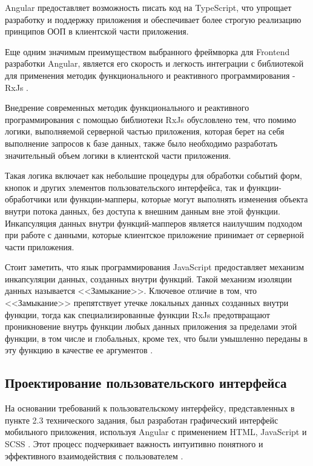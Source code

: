 Angular предоставляет возможность писать код на TypeScript, что упрощает разработку и поддержку приложения и обеспечивает более строгую реализацию принципов ООП в клиентской части приложения.

Еще одним значимым преимуществом выбранного фреймворка для Frontend разработки Angular, является его скорость и легкость интеграции с библиотекой для применения методик функционального и реактивного программирования -\- RxJs \cite{rxjs}.

Внедрение современных методик функционального и реактивного программирования с помощью библиотеки RxJs обусловлено тем, что помимо логики, выполняемой серверной частью приложения, которая берет на себя выполнение запросов к базе данных, также было необходимо разработать значительный объем логики в клиентской части приложения.

Такая логика включает как небольшие процедуры для обработки событий форм, кнопок и других элементов пользовательского интерфейса, так и функции-обработчики или функции-мапперы, которые могут выполнять изменения объекта внутри потока данных, без доступа к внешним данным вне этой функции. Инкапсуляция данных внутри функций-мапперов является наилучшим подходом при работе с данными, которые клиентское приложение принимает от серверной части приложения.

Стоит заметить, что язык программирования JavaScript предоставляет механизм инкапсуляции данных, созданных внутри функций. Такой механизм изоляции данных называется <<Замыкание>>. Ключевое отличие в том, что <<Замыкание>> препятствует утечке локальных данных созданных внутри функции, тогда как специализированные функции RxJs предотвращают проникновение внутрь функции любых данных приложения за пределами этой функции, в том числе и глобальных, кроме тех, что были умышленно переданы в эту функцию в качестве ее аргументов \cite{rxjs}.

\subsection{Проектирование пользовательского интерфейса}

На основании требований к пользовательскому интерфейсу, представленных в пункте 2.3 технического задания, был разработан графический интерфейс мобильного приложения, используя Angular с применением HTML, JavaScript и SCSS \cite{cssspecs}. Этот процесс подчеркивает важность интуитивно понятного и эффективного взаимодействия с пользователем \cite{kumskova}.

